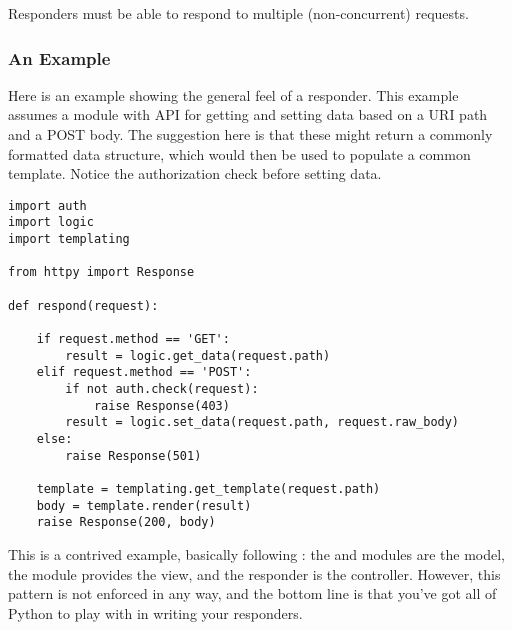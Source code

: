 Responders must be able to respond to multiple (non-concurrent) requests.


\subsubsection{An Example}

Here is an example showing the general feel of a responder. This example assumes
a  module with API for getting and setting data based on a URI path
and a POST body. The suggestion here is that these might return a commonly
formatted data structure, which would then be used to populate a common
template. Notice the authorization check before setting data.

\begin{verbatim}
import auth
import logic
import templating

from httpy import Response

def respond(request):

    if request.method == 'GET':
        result = logic.get_data(request.path)
    elif request.method == 'POST':
        if not auth.check(request):
            raise Response(403)
        result = logic.set_data(request.path, request.raw_body)
    else:
        raise Response(501)

    template = templating.get_template(request.path)
    body = template.render(result)
    raise Response(200, body)

\end{verbatim}


This is a contrived example, basically following : the
 and  modules are the model, the 
module provides the view, and the responder is the controller. However, this
pattern is not enforced in any way, and the bottom line is that you've got all
of Python to play with in writing your responders.

